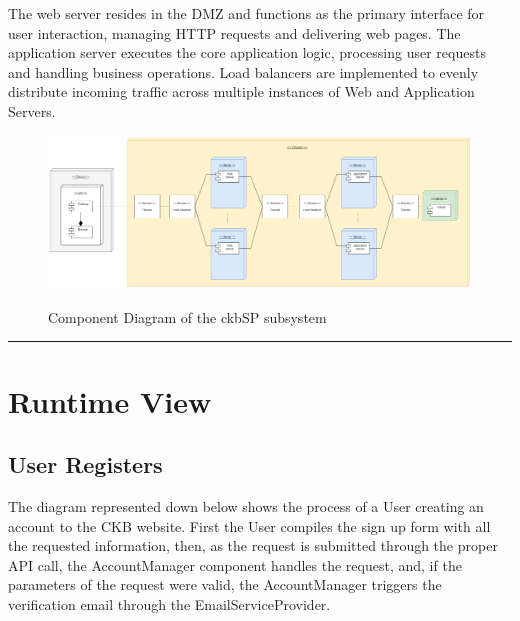\documentclass{Configuration_Files/Template}
\begin{document}
The web server resides in the DMZ and functions as the primary interface for user interaction, managing HTTP requests and delivering web pages. The application server executes the core application logic, processing user requests and handling business operations. Load balancers are implemented to evenly distribute incoming traffic across multiple instances of Web and Application Servers.

\begin{figure}[H]
\centering
\includegraphics[scale = 0.4]{Images/diagrams/Deployment_view.png}\\
\caption{Component Diagram of the ckbSP subsystem}
\end{figure}

{\color{bluepoli}\rule{\linewidth}{0.1pt}}

\section{Runtime View}

\subsection{User Registers}

The diagram represented down below shows the process of a User creating an account to the CKB website. First the User compiles the sign up form with all the requested information, then, as the request is submitted through the proper API call, the AccountManager component handles the request, and, if the parameters of the request were valid, the AccountManager triggers the verification email through the EmailServiceProvider.
\end{document}
